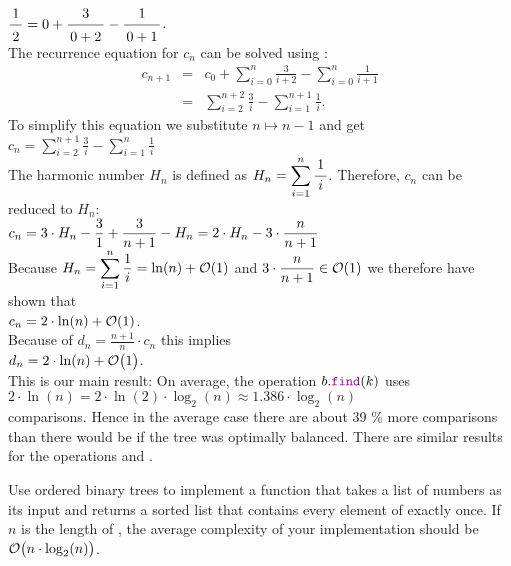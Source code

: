 $\bruch{1}{2} = 0 + \bruch{3}{0+2} - \bruch{1}{0+1}$.
\\[0.2cm]
The recurrence equation for $c_n$ can be solved using  :
\begin{eqnarray*}  
  c_{n+1} & = & c_0 + \sum\limits_{i=0}^{n} \frac{3}{i+2} - \sum\limits_{i=0}^{n} \frac{1}{i+1} 
\\[0.2cm]
          & = & \sum\limits_{i=2}^{n+2} \frac{3}{i} - \sum\limits_{i=1}^{n+1} \frac{1}{i}.
\end{eqnarray*}
To simplify this equation we substitute $n \mapsto n-1$ and get
\\[0.2cm]
\hspace*{1.3cm}
$c_{n} =  \displaystyle\sum\limits_{i=2}^{n+1} \frac{3}{i} - \sum\limits_{i=1}^{n} \frac{1}{i}$
\\[0.2cm]
The harmonic number  $H_n$ is defined as 
$H_n = \ds\sum\limits_{i=1}^{n} \bruch{1}{i}$.   
Therefore,  $c_n$ can be reduced to $H_n$: 
\\[0.2cm]
\hspace*{1.3cm}
$c_n = \displaystyle 3 \cdot H_n - \frac{3}{1} + \frac{3}{n+1} - H_n  =  \displaystyle 2 \cdot H_n - 3 \cdot \frac{n}{n+1}$
\\[0.2cm] 
Because $H_n = \displaystyle\sum\limits_{i=1}^{n} \frac{1}{i} = \ln(n) + \mathcal{O}(1)$ and $\displaystyle 3 \cdot\frac{n}{n+1} \in \mathcal{O}(1)$
we therefore have shown that
  \\[0.3cm]
\hspace*{1.3cm} 
$\displaystyle c_n = 2 \cdot \ln(n) + \mathcal{O}(1)$.
\\[0.3cm]
Because of  $d_n = \frac{n+1}{n}\cdot c_n$ this implies \\[0.2cm]
\hspace*{1.3cm}
 $\displaystyle d_n = 2 \cdot \ln(n) + \mathcal{O}\bigl(1\bigr)$.
\\[0.2cm]
This is our main result:  On average, the operation $b.\mytt{find}(k)$ uses
\\[0.2cm]
\hspace*{1.3cm}
$2 \cdot \ln(n) = 2 \cdot \ln(2) \cdot \log_2(n) \approx 1.386 \cdot \log_2(n)$ 
\\[0.2cm]
comparisons.  Hence in the average case there are about  39 \% 
more comparisons than there would be if the tree was optimally balanced.
There are similar results for the operations  and .

\exercise
Use ordered binary trees to implement a function  that takes a list of numbers  as
its input and returns a sorted list  that contains every element of   exactly once.  If
$n$ is the length of , the average complexity of your implementation should be $\mathcal{O}\bigl(n \cdot \log_2(n)\bigr)$. \eox


